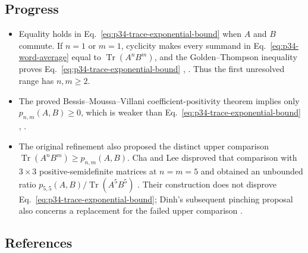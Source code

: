 \subsection*{Progress}

\begin{itemize}
  \item Equality holds in Eq.~\eqref{eq:p34-trace-exponential-bound} when
  $A$ and $B$ commute.  If $n=1$ or $m=1$, cyclicity makes every summand in
  Eq.~\eqref{eq:p34-word-average} equal to
  $\operatorname{Tr}(A^nB^m)$, and the Golden--Thompson inequality proves
  Eq.~\eqref{eq:p34-trace-exponential-bound}
  ,
  .  Thus the first unresolved range has
  $n,m\geq2$.

  \item The proved Bessis--Moussa--Villani coefficient-positivity theorem
  implies only $p_{n,m}(A,B)\geq0$, which is weaker than
  Eq.~\eqref{eq:p34-trace-exponential-bound}
  ,
  .

  \item The original refinement also proposed the distinct upper comparison
  $\operatorname{Tr}(A^nB^m)\geq p_{n,m}(A,B)$.  Cha and Lee disproved that
  comparison with $3\times3$ positive-semidefinite matrices at $n=m=5$ and
  obtained an unbounded ratio
  $p_{5,5}(A,B)/\operatorname{Tr}(A^5B^5)$
  .  Their construction does not disprove
  Eq.~\eqref{eq:p34-trace-exponential-bound}; Dinh's subsequent pinching
  proposal also concerns a replacement for the failed upper comparison
  .
\end{itemize}

\subsection*{References}

